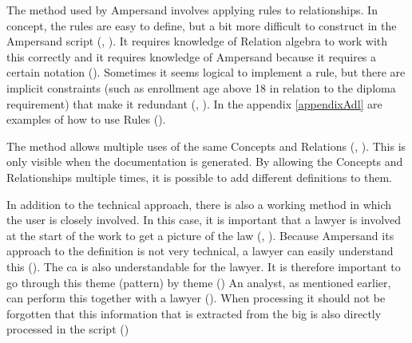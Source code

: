The method used by Ampersand involves applying rules to relationships.
In concept, the rules are easy to define, but a bit more difficult to construct in the Ampersand script (, ).
It requires knowledge of Relation algebra to work with this correctly and it requires knowledge of Ampersand because it requires a certain notation ().
Sometimes it seems logical to implement a rule, but there are implicit constraints (such as enrollment age above 18 in relation to the diploma requirement) that make it redundant (, ).
In the appendix \ref{appendixAdl} are examples of how to use Rules ().
\label{s:2_4_concept_reuse}

The method allows multiple uses of the same Concepts and Relations (, ).
This is only visible when the documentation is generated.
By allowing the Concepts and Relationships multiple times, it is possible to add different definitions to them.
\label{s:2_5_team}

In addition to the technical approach, there is also a working method in which the user is closely involved.
In this case, it is important that a lawyer is involved at the start of the work to get a picture of the law (, ).
Because Ampersand its approach to the definition is not very technical, a lawyer can easily understand this ().
The \acrshort{ca} is also understandable for the lawyer.
It is therefore important to go through this theme (pattern) by theme ()
An analyst, as mentioned earlier, can perform this together with a lawyer ().
When processing it should not be forgotten that this information that is extracted from the \acrshort{big} is also directly processed in the script ()
\label{s:2_6_prototype_use}

